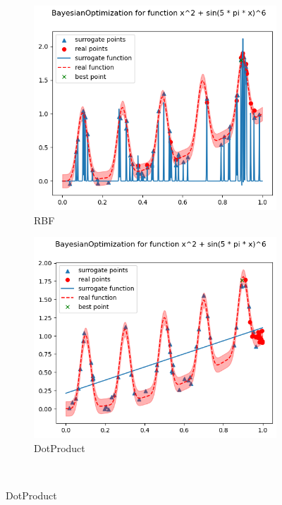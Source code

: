 \begin{figure}[H]
    \begin{subfigure}{0.5\textwidth}
        \includegraphics[width=\textwidth]{lab6/imgs/obj3_rbf.png}
        \caption{RBF}
    \end{subfigure}
    \begin{subfigure}{0.5\textwidth}
        \includegraphics[width=\textwidth]{lab6/imgs/obj3_dot.png}
        \caption{DotProduct}
    \end{subfigure} \\

\end{figure}
